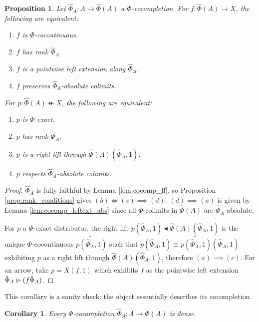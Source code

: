 \documentclass[10pt,a4paper]{article}
\newcommand{\coce}[2]{{\hat{#1}}_{#2}}
\newcommand{\coc}[2]{{\widehat{#1}}(#2)}
\newcommand{\dfrom}{\nvleftarrow}
\newcommand{\plext}{\mathbin{{\rhd}\mathclap{\mspace{-17.5mu}\cdot}}}
\newcommand{\rift}{\mathbin{\blacktriangleleft}}
\newcommand{\simeqq}{\cong}
\theoremstyle{plain}
\newtheorem{proposition}[theorem]{Proposition}
\newtheorem{corollary}[theorem]{Corollary}
\theoremstyle{definition}
\theoremstyle{remark}
\begin{document}
\begin{proposition}
    Let $\coce\Phi A : A \to \coc\Phi A$ a $\Phi$-cocompletion. For $f : \coc\Phi A \to X$, the following are equivalent:
    \begin{enumerate}
        \item $f$ is $\Phi$-cocontinuous.
        \item $f$ has rank $\coce\Phi A$
        \item $f$ is a pointwise left extension along $\coce\Phi A$.
        \item $f$ preserves $\coce\Phi A$-absolute colimits.
    \end{enumerate}
    For $p : \coc\Phi A\dfrom X$, the following are equivalent:
    \begin{enumerate}
        \item $p$ is $\Phi$-exact.
        \item $p$ has rank $\coce\Phi A$.
        \item $p$ is a right lift through $\coc\Phi A(\coce\Phi A, 1)$.
        \item $p$ respects $\coce\Phi A$-absolute colimits.
    \end{enumerate}
\end{proposition}

\begin{proof}
    $\coce\Phi A$ is fully faithful by Lemma \ref{lem:cocomp_ff}, so Proposition \ref{prop:rank_conditions} gives $(b) \iff (c) \implies (d)$. $(d) \implies (a)$ is given by Lemma \ref{lem:cocomp_leftext_abs} since all $\Phi$-colimits in $\coc\Phi A$ are $\coce\Phi A$-absolute.

    For $p$ a $\Phi$-exact distributor, the right lift $p(\coce\Phi A, 1)\rift\coc\Phi A(\coce\Phi A, 1)$ is the unique $\Phi$-cocontinuous $\widetilde{p(\coce\Phi A, 1)}$ such that $p(\coce\Phi A, 1) \simeqq \widetilde{p(\coce\Phi A, 1)}(\coce\Phi A, 1)$ exhibiting $p$ as a right lift through $\coc\Phi A(\coce\Phi A, 1)$, therefore $(a) \implies (c)$. For an arrow, take $p = X(f, 1)$ which exhibits $f$ as the pointwise left extension $\coce\Phi A \plext (f\coce\Phi A)$.
\end{proof}

This corollary is a sanity check: the object essentially describes its cocompletion.

\begin{corollary}
    \label{cor:cocomp_dense}
    Every $\Phi$-cocompletion $\coce\Phi A : A \to \coc\Phi A$ is dense.
\end{corollary}
\end{document}
